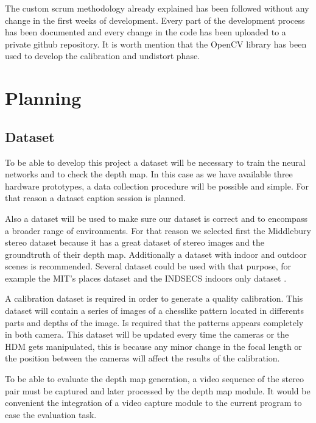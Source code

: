 \documentclass[10pt,a4paper,twocolumn,twoside]{article}
\begin{document}
	The custom scrum methodology already explained has been followed without any change in the first weeks of development. Every part of the development process has been documented and every change in the code has been uploaded to a private github repository. It is worth mention that the OpenCV \cite{web:opencv} library has been used to develop the calibration and undistort phase. 
	
	\section{Planning}
	\label{sec:planning}
	
	\subsection{Dataset}
	\label{subsec:dataset}
	To be able to develop this project a dataset will be necessary to train the neural networks and to check the depth map. In this case as we have available three hardware prototypes, a data collection procedure will be possible and simple. For that reason a dataset caption session is planned.
	
	Also a dataset will be used to make sure our dataset is correct and to encompass a broader range of environments. For that reason we selected first the Middlebury stereo dataset \cite{web:middelburyDataset} because it has a great dataset of stereo images and the groundtruth of their depth map. Additionally a dataset with indoor and outdoor scenes is recommended. Several dataset could be used with that purpose, for example the MIT's places dataset \cite{web:mitplaces} and the INDSECS indoors only dataset \cite{web:indecs}.
	
	A calibration dataset is required in order to generate a quality calibration. This dataset will contain a series of images of a chesslike pattern \cite{?} located in differents parts and depths of the image. Is required that the patterns appears completely in both camera. This dataset will be updated every time the cameras or the HDM gets manipulated, this is because any minor change in the focal length or the position between the cameras will affect the results of the calibration.
	
	To be able to evaluate the depth map generation, a video sequence of the stereo pair must be captured and later processed by the depth map module. It would be convenient the integration of a video capture module to the current program to ease the evaluation task.
	
\end{document}
